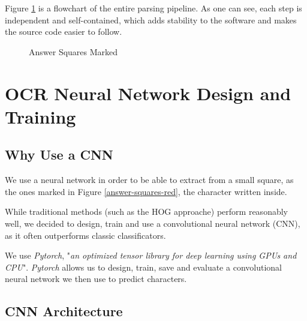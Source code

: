 \documentclass[11pt, a4paper]{report}
\begin{document}
Figure \ref{parsing-flow} is a flowchart of the entire parsing pipeline. As one can see, each step is independent and self-contained, which adds stability to the software and makes the source code easier to follow. 

\begin{figure}[!h]
	\centering
	\caption{Answer Squares Marked}
	\label{parsing-flow}
\end{figure}



\chapter{OCR Neural Network Design and Training}

\section{Why Use a CNN}

We use a neural network in order to be able to extract from a small square, as the ones marked in Figure \ref{answer-squares-red}, the character written inside.

While traditional methods (such as the HOG\cite{HOG} approache) perform reasonably well, we decided to design, train and use a convolutional neural network (CNN)\cite{CNN}, as it often outperforms classic classificators.

We use \textit{Pytorch}, "\textit{an optimized tensor library for deep learning using GPUs and CPU}"\cite{pytorch}. \textit{Pytorch} allows us to design, train, save and evaluate a convolutional neural network we then use to predict characters.

\section{CNN Architecture}
\end{document}
